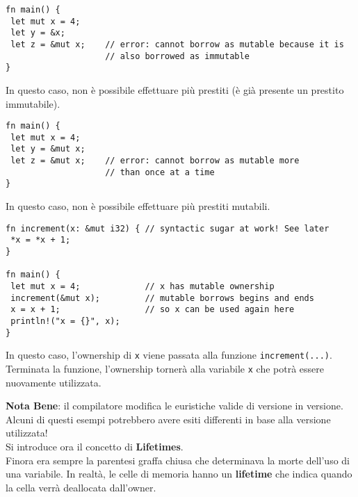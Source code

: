 \documentclass{article}
\begin{document}
\pagebreak

\begin{tcolorbox}
\begin{verbatim}
fn main() {
 let mut x = 4;
 let y = &x;
 let z = &mut x;    // error: cannot borrow as mutable because it is 
                    // also borrowed as immutable
}
\end{verbatim}
\end{tcolorbox}
In questo caso, non è possibile effettuare più prestiti (è già presente un prestito immutabile).\vspace{8pt}

\begin{tcolorbox}
\begin{verbatim}
fn main() {
 let mut x = 4;
 let y = &mut x;
 let z = &mut x;    // error: cannot borrow as mutable more 
                    // than once at a time
}
\end{verbatim}
\end{tcolorbox}
In questo caso, non è possibile effettuare più prestiti mutabili.\vspace{8pt}

\begin{tcolorbox}
\begin{verbatim}
fn increment(x: &mut i32) { // syntactic sugar at work! See later
 *x = *x + 1;
}

fn main() {
 let mut x = 4;             // x has mutable ownership
 increment(&mut x);         // mutable borrows begins and ends
 x = x + 1;                 // so x can be used again here
 println!("x = {}", x);
}
\end{verbatim}
\end{tcolorbox}
In questo caso, l'ownership di \texttt{x} viene passata alla funzione \texttt{increment(...)}. Terminata la funzione, l'ownership tornerà alla variabile \texttt{x} che potrà essere nuovamente utilizzata.\vspace{8pt}

\textbf{Nota Bene}: il compilatore modifica le euristiche valide di versione in versione. Alcuni di questi esempi potrebbero avere esiti differenti in base alla versione utilizzata!\vspace{14pt}\\
Si introduce ora il concetto di \textbf{Lifetimes}.\\
Finora era sempre la parentesi graffa chiusa che determinava la morte dell'uso di una variabile. In realtà, le celle di memoria hanno un \textbf{lifetime} che indica quando la cella verrà deallocata dall’owner.
\end{document}
